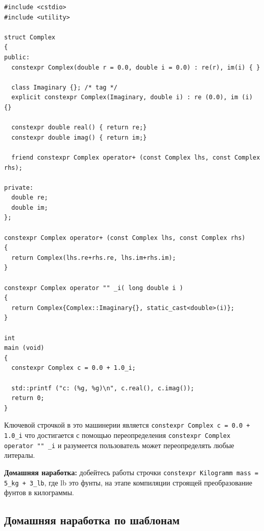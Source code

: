\documentclass[a4paper,12pt,oneside]{article}
\begin{document}
\begin{lstlisting}
#include <cstdio>
#include <utility>

struct Complex
{
public:
  constexpr Complex(double r = 0.0, double i = 0.0) : re(r), im(i) { }

  class Imaginary {}; /* tag */
  explicit constexpr Complex(Imaginary, double i) : re (0.0), im (i) {}

  constexpr double real() { return re;}
  constexpr double imag() { return im;}

  friend constexpr Complex operator+ (const Complex lhs, const Complex rhs);

private:
  double re;
  double im;
};

constexpr Complex operator+ (const Complex lhs, const Complex rhs)
{
  return Complex(lhs.re+rhs.re, lhs.im+rhs.im);
}

constexpr Complex operator "" _i( long double i )
{
  return Complex{Complex::Imaginary{}, static_cast<double>(i)};
}

int
main (void)
{
  constexpr Complex c = 0.0 + 1.0_i;

  std::printf ("c: (%g, %g)\n", c.real(), c.imag());
  return 0;
}
\end{lstlisting}

Ключевой строчкой в это машинерии является \lstinline!constexpr Complex c = 0.0 + 1.0_i! что достигается с помощью переопределения \lstinline!constexpr Complex operator "" _i! и разумеется пользователь может переопределять любые литералы.

\textbf{Домашняя наработка:} добейтесь работы строчки \lstinline!constexpr Kilogramm mass = 5_kg + 3_lb!, где lb это фунты, на этапе компиляции строящей преобразование фунтов в килограммы.

\pagebreak
\subsection{Домашняя наработка по шаблонам}
\end{document}
